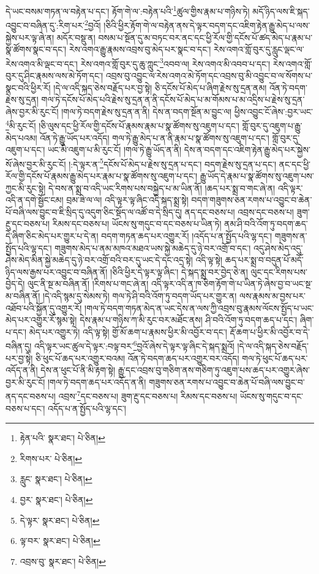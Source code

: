 དེ་ཡང་བསམ་གཏན་ལ་བརྟེན་པ་དང་། རྟོག་གེ་ལ་:བརྟེན་པའི་\footnote{རྟེན་པའི་  སྣར་ཐང་།  པེ་ཅིན། }ཚུལ་གྱིས་རྣམ་པ་གཉིས་ཏེ། མདོ་ཉིད་ལས་ཇི་སྐད་འབྱུང་བ་བཞིན་དུ་:རིག་པར་\footnote{རིགས་པར་  པེ་ཅིན། }བྱའོ། །ཅིའི་ཕྱིར་རྟོག་གེ་ལ་བརྟེན་ནས་དེ་ལྟར་བདག་དང་འཇིག་རྟེན་རྒྱུ་མེད་པ་ལས་སྐྱེས་པར་ལྟ་ཞེ་ན། མདོར་བསྡུ་ན། བསམ་པ་སྔོན་དུ་མ་བཏང་བར་ནང་དང་ཕྱི་རོལ་གྱི་དངོས་པོ་ཚད་མེད་པ་རྣམ་པ་སྣ་ཚོགས་སྣང་བ་དང་། རེས་འགའ་རྒྱུ་རྣམས་འབྲས་བུ་མེད་པར་སྣང་བ་དང་། རེས་འགའ་གློ་བུར་དུ་རླུང་ལྡང་ལ་རེས་འགའ་མི་ལྡང་བ་དང་། རེས་འགའ་གློ་བུར་དུ་ཆུ་ཀླུང་\footnote{རླུང་  སྣར་ཐང་།  པེ་ཅིན། }འབབ་ལ། རེས་འགའ་མི་འབབ་པ་དང་། རེས་འགའ་གློ་བུར་དུ་ཤིང་རྣམས་ལས་མེ་ཏོག་དང་། འབྲས་བུ་འབྱུང་ལ་རེས་འགའ་མེ་ཏོག་དང་འབྲས་བུ་མི་འབྱུང་བ་ལ་སོགས་པ་སྣང་བའི་ཕྱིར་རོ། །དེ་ལ་འདི་སྐད་ཅེས་བརྗོད་པར་བྱ་སྟེ། ཅི་དངོས་པོ་མེད་པ་ཞིག་རྗེས་སུ་དྲན་ནམ། འོན་ཏེ་བདག་རྗེས་སུ་དྲན། གལ་ཏེ་དངོས་པོ་མེད་པའི་རྗེས་སུ་དྲན་ན་ནི་དངོས་པོ་མེད་པ་མ་གོམས་པ་མ་འདྲིས་པ་རྗེས་སུ་དྲན་ཞེས་བྱར་མི་རུང་ངོ། །གལ་ཏེ་བདག་རྗེས་སུ་དྲན་ན་ནི། དེས་ན་བདག་སྔོན་མ་བྱུང་ལ། ཕྱིས་འབྱུང་ངོ་ཞེས་:བྱར་ཡང་\footnote{བྱར་  སྣར་ཐང་།  པེ་ཅིན། }མི་རུང་ངོ། །ཅི་ལུས་དང་ཕྱི་རོལ་གྱི་དངོས་པོ་རྣམས་རྣམ་པ་སྣ་ཚོགས་སུ་འཇུག་པ་དང་། གློ་བུར་དུ་འཇུག་པ་རྒྱུ་མེད་པའམ། འོན་ཏེ་རྒྱུ་ཡོད་པར་འདོད། གལ་ཏེ་རྒྱུ་མེད་པ་ན་ནི་རྣམ་པ་སྣ་ཚོགས་སུ་འཇུག་པ་དང་། གློ་བུར་དུ་འཇུག་པ་དང་། ཡང་མི་འཇུག་པ་མི་རུང་ངོ། །གལ་ཏེ་རྒྱུ་ཡོད་ན་ནི། དེས་ན་བདག་དང་འཇིག་རྟེན་རྒྱུ་མེད་པར་སྐྱེས་སོ་ཞེས་བྱར་མི་རུང་ངོ། །:དེ་ལྟར་ན་\footnote{དེ་ལྟར་  སྣར་ཐང་།  པེ་ཅིན། }དངོས་པོ་མེད་པ་རྗེས་སུ་དྲན་པ་དང་། བདག་རྗེས་སུ་དྲན་པ་དང་། ནང་དང་ཕྱི་རོལ་གྱི་དངོས་པོ་རྣམས་རྒྱུ་མེད་པར་རྣམ་པ་སྣ་ཚོགས་སུ་འཇུག་པ་དང་། རྒྱུ་ཡོད་དེ་རྣམ་པ་སྣ་ཚོགས་སུ་འཇུག་པས་ཀྱང་མི་རུང་སྟེ། དེ་བས་ན་སྨྲ་བ་འདི་ཡང་རིགས་པས་བསྐྱེད་པ་མ་ཡིན་ནོ། །ཆད་པར་སྨྲ་བ་གང་ཞེ་ན། འདི་ལྟར་འདི་ན་དགེ་སྦྱོང་ངམ། བྲམ་ཟེ་ལ་ལ། འདི་ལྟར་ལྟ་ཞིང་འདི་སྐད་སྨྲ་སྟེ། བདག་གཟུགས་ཅན་རགས་པ་འབྱུང་བ་ཆེན་པོ་བཞི་ལས་བྱུང་བ་ཇི་སྲིད་དུ་འདུག་ཅིང་སྡོད་ལ་འཚོ་བ་དེ་སྲིད་དུ། ནད་དང་བཅས་པ། འབྲས་དང་བཅས་པ། ཟུག་རྔུ་དང་བཅས་པ། རིམས་དང་བཅས་པ། ཡོངས་སུ་གདུང་བ་དང་བཅས་པ་ཡིན་ཏེ། ནམ་ཤི་བའི་འོག་ཏུ་བདག་ཆད་དེ་ཞིག་ཅིང་མེད་པར་གྱུར་པ་དེ་ན། བདག་གཏན་ཆད་པར་འགྱུར་རོ། །འདོད་པ་ན་སྤྱོད་པའི་ལྷ་དང་། གཟུགས་ན་སྤྱོད་པའི་ལྷ་དང་། གཟུགས་མེད་པ་ནམ་མཁའ་མཐའ་ཡས་སྐྱེ་མཆེད་དུ་ཉེ་བར་འགྲོ་བ་དང་། འདུ་ཤེས་མེད་འདུ་ཤེས་མེད་མིན་སྐྱེ་མཆེད་དུ་ཉེ་བར་འགྲོ་བའི་བར་དུ་ཡང་དེ་དང་འདྲ་སྟེ། འདི་ལྟ་སྟེ། ཆད་པར་སྨྲ་བ་བདུན་པོ་མདོ་ཉིད་ལས་རྒྱས་པར་འབྱུང་བ་བཞིན་ནོ། །ཅིའི་ཕྱིར་དེ་ལྟར་ལྟ་ཞིང་། དེ་སྐད་སྨྲ་བར་བྱེད་ཅེ་ན། ལུང་དང་རིགས་པས་བྱེད་དེ། ལུང་ནི་སྔ་མ་བཞིན་ནོ། །རིགས་པ་གང་ཞེ་ན། འདི་ལྟར་འདི་ན་ཁ་ཅིག་རྟོག་གེ་པ་ཡིན་ཏེ་ཞེས་བྱ་བ་ཡང་སྔ་མ་བཞིན་ནོ། །དེ་འདི་སྙམ་དུ་སེམས་ཏེ། གལ་ཏེ་ཤི་བའི་འོག་ཏུ་བདག་ཡོད་པར་གྱུར་ན། ལས་རྣམས་མ་བྱས་པར་འཐོབ་པའི་སྐྱོན་དུ་འགྱུར་རོ། །གལ་ཏེ་བདག་གཏན་མེད་ན་ཡང་དེས་ན་ལས་ཀྱི་འབྲས་བུ་རྣམས་ལོངས་སྤྱོད་པ་ཡང་མེད་པར་འགྱུར་རོ་སྙམ་སྟེ། དེས་རྣམ་པ་གཉིས་ཀ་མི་རུང་བར་མཐོང་ནས། ཤི་བའི་འོག་ཏུ་བདག་ཆད་པ་དང་། ཞིག་པ་དང་། མེད་པར་འགྱུར་ཏེ། འདི་ལྟ་སྟེ། གྱོ་མོ་ཆག་པ་རྣམས་ཕྱིར་མི་འབྱོར་བ་དང་། རྡོ་ཆག་པ་ཕྱིར་མི་འབྱོར་བ་དེ་བཞིན་དུ། འདི་ལྟར་ཡང་ཚུལ་དེ་ལྟར་:བལྟ་བར་\footnote{ལྟ་བར་  སྣར་ཐང་།  པེ་ཅིན། }བྱའོ་ཞེས་དེ་ལྟར་ལྟ་ཞིང་དེ་སྐད་སྨྲའོ། །དེ་ལ་འདི་སྐད་ཅེས་བརྗོད་པར་བྱ་སྟེ། ཅི་ཕུང་པོ་ཆད་པར་འགྱུར་བའམ། འོན་ཏེ་བདག་ཆད་པར་འགྱུར་བར་འདོད། གལ་ཏེ་ཕུང་པོ་ཆད་པར་འདོད་ན་ནི། དེས་ན་ཕུང་པོ་ནི་མི་རྟག་སྟེ། རྒྱུ་དང་འབྲས་བུ་གཅིག་ནས་གཅིག་ཏུ་འཇུག་པས་ཆད་པར་འགྱུར་ཞེས་བྱར་མི་རུང་ངོ། །གལ་ཏེ་བདག་ཆད་པར་འདོད་ན་ནི། གཟུགས་ཅན་རགས་པ་འབྱུང་བ་ཆེན་པོ་བཞི་ལས་བྱུང་བ་ནད་དང་བཅས་པ། འབྲས་\footnote{འབྲས་བུ་  སྣར་ཐང་།  པེ་ཅིན། }དང་བཅས་པ། ཟུག་རྔུ་དང་བཅས་པ། རིམས་དང་བཅས་པ། ཡོངས་སུ་གདུང་བ་དང་བཅས་པ་དང་། འདོད་པ་ན་སྤྱོད་པའི་ལྷ་དང་། 